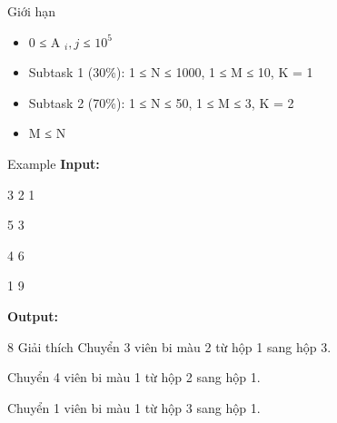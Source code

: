 Giới hạn  
\begin{itemize}
	\item     0 ≤ A    $_     i, j    $    ≤ $10^{5}$
	\item     Subtask 1 (30\%): 1 ≤ N ≤ 1000, 1 ≤ M ≤ 10, K = 1   
	\item     Subtask 2 (70\%): 1 ≤ N ≤ 50, 1 ≤ M ≤ 3, K = 2   
	\item     M ≤ N   
\end{itemize}
   Example  
\textbf{    Input:   }

   3 2 1  

   5 3  

   4 6  

   1 9  

\textbf{    Output:   }

   8
   Giải thích  
Chuyển 3 viên bi màu 2 từ hộp 1 sang hộp 3.  

   Chuyển 4 viên bi màu 1 từ hộp 2 sang hộp 1.  

   Chuyển 1 viên bi màu 1 từ hộp 3 sang hộp 1.